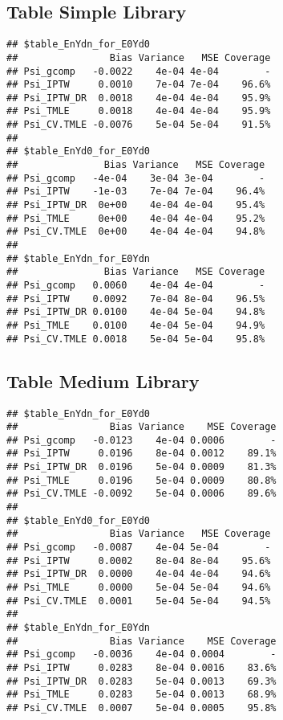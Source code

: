 \documentclass[11pt]{article}\usepackage[]{graphicx}\usepackage[]{color}
\makeatletter
\newenvironment{kframe}{%
 \def\at@end@of@kframe{}%
 \ifinner\ifhmode%
  \def\at@end@of@kframe{\end{minipage}}%
  \begin{minipage}{\columnwidth}%
 \fi\fi%
 \def\FrameCommand##1{\hskip\@totalleftmargin \hskip-\fboxsep
 \colorbox{shadecolor}{##1}\hskip-\fboxsep
     \hskip-\linewidth \hskip-\@totalleftmargin \hskip\columnwidth}%
 \MakeFramed {\advance\hsize-\width
   \@totalleftmargin\z@ \linewidth\hsize
   \@setminipage}}%
 {\par\unskip\endMakeFramed%
 \at@end@of@kframe}
\newenvironment{knitrout}{}{} %
\makeatother
\begin{document}
\subsection{Table Simple Library}
\begin{knitrout}
\color{fgcolor}\begin{kframe}
\begin{verbatim}
## $table_EnYdn_for_E0Yd0
##                Bias Variance   MSE Coverage
## Psi_gcomp   -0.0022    4e-04 4e-04        -
## Psi_IPTW     0.0010    7e-04 7e-04    96.6%
## Psi_IPTW_DR  0.0018    4e-04 4e-04    95.9%
## Psi_TMLE     0.0018    4e-04 4e-04    95.9%
## Psi_CV.TMLE -0.0076    5e-04 5e-04    91.5%
## 
## $table_EnYd0_for_E0Yd0
##               Bias Variance   MSE Coverage
## Psi_gcomp   -4e-04    3e-04 3e-04        -
## Psi_IPTW    -1e-03    7e-04 7e-04    96.4%
## Psi_IPTW_DR  0e+00    4e-04 4e-04    95.4%
## Psi_TMLE     0e+00    4e-04 4e-04    95.2%
## Psi_CV.TMLE  0e+00    4e-04 4e-04    94.8%
## 
## $table_EnYdn_for_E0Ydn
##               Bias Variance   MSE Coverage
## Psi_gcomp   0.0060    4e-04 4e-04        -
## Psi_IPTW    0.0092    7e-04 8e-04    96.5%
## Psi_IPTW_DR 0.0100    4e-04 5e-04    94.8%
## Psi_TMLE    0.0100    4e-04 5e-04    94.9%
## Psi_CV.TMLE 0.0018    5e-04 5e-04    95.8%
\end{verbatim}
\end{kframe}
\end{knitrout}
\subsection{Table Medium Library}
\begin{knitrout}
\color{fgcolor}\begin{kframe}
\begin{verbatim}
## $table_EnYdn_for_E0Yd0
##                Bias Variance    MSE Coverage
## Psi_gcomp   -0.0123    4e-04 0.0006        -
## Psi_IPTW     0.0196    8e-04 0.0012    89.1%
## Psi_IPTW_DR  0.0196    5e-04 0.0009    81.3%
## Psi_TMLE     0.0196    5e-04 0.0009    80.8%
## Psi_CV.TMLE -0.0092    5e-04 0.0006    89.6%
## 
## $table_EnYd0_for_E0Yd0
##                Bias Variance   MSE Coverage
## Psi_gcomp   -0.0087    4e-04 5e-04        -
## Psi_IPTW     0.0002    8e-04 8e-04    95.6%
## Psi_IPTW_DR  0.0000    4e-04 4e-04    94.6%
## Psi_TMLE     0.0000    5e-04 5e-04    94.6%
## Psi_CV.TMLE  0.0001    5e-04 5e-04    94.5%
## 
## $table_EnYdn_for_E0Ydn
##                Bias Variance    MSE Coverage
## Psi_gcomp   -0.0036    4e-04 0.0004        -
## Psi_IPTW     0.0283    8e-04 0.0016    83.6%
## Psi_IPTW_DR  0.0283    5e-04 0.0013    69.3%
## Psi_TMLE     0.0283    5e-04 0.0013    68.9%
## Psi_CV.TMLE  0.0007    5e-04 0.0005    95.8%
\end{verbatim}
\end{kframe}
\end{knitrout}
\end{document}
